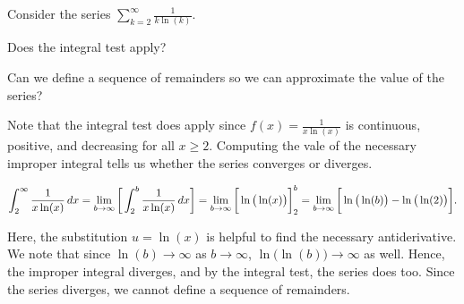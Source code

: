 \documentclass{ximera}
\author{Jim Talamo}
\begin{document}
\begin{exercise}

Consider the series $\sum_{k=2}^{\infty} \frac{1}{k \ln(k)}$.  

Does the integral test apply?

\begin{multipleChoice}
\end{multipleChoice}

Can we define a sequence of remainders so we can approximate the value of the series?

\begin{multipleChoice}
\end{multipleChoice}

\begin{feedback}
Note that the integral test does apply since $f(x) =\frac{1}{x \ln(x)}$ is continuous, positive, and decreasing for all $x \geq 2$.  Computing the vale of the necessary improper integral tells us whether the series converges or diverges.

\[
\int_2^\infty  \frac{1}{x \ln(x)} \mathop{}\!d x = \lim_{b \to \infty} \bigg[ \int_2^b  \frac{1}{x \ln(x)} \mathop{}\!d x \bigg] = \lim_{b \to \infty} \bigg[ \ln\big(\ln(x)\big) \bigg]_2^b = \lim_{b \to \infty} \bigg[ \ln\big(\ln(b)\big) - \ln\big(\ln(2)\big)  \bigg].
\]

Here, the substitution $u=\ln(x)$ is helpful to find the necessary antiderivative. We note that since $\ln(b) \rightarrow \infty$ as $b \rightarrow \infty$, $\ln\big(\ln(b)\big) \rightarrow \infty$ as well.   Hence, the improper integral diverges, and by the integral test, the series does too.  Since the series diverges, we cannot define a sequence of remainders. 
\end{feedback}

\end{exercise}
\end{document}
